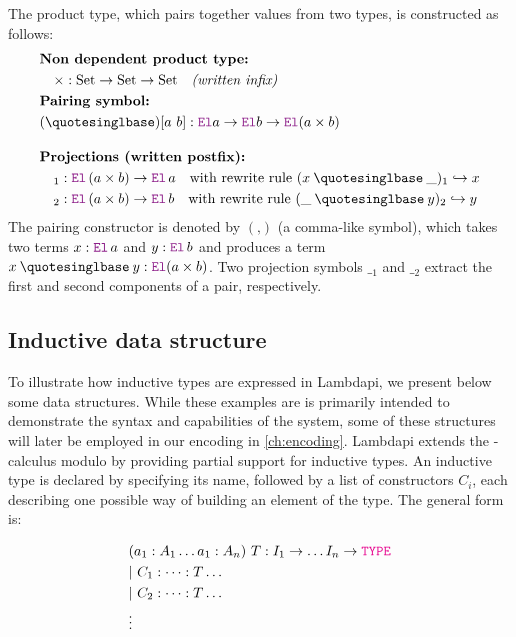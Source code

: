 \begin{example}\label{def-product}
The product type, which pairs together values from two types, is constructed as follows:
\begin{align*}
&\textbf{Non dependent product type:} \\
&\quad \times \index{$\times$} : \text{Set} \to \text{Set} \to \text{Set} \quad \textit{(written infix)} \\
&\textbf{Pairing symbol:} \\
&(\mathbin{‚}) \index{$(\_ \mathbin{,} \_)$} [a~b] : \el a \ra \el b \ra \el (a \times b)\\[1em]
&\textbf{Projections (written postfix):}  \\
&\quad {}_1 \index{${}_1$}: \el\, (a \times b) \ra \el\, a \quad \text{with rewrite rule } (x \mathbin{‚} \_)_1 \re x \\
&\quad {}_2 \index{${}_2$}: \el\, (a \times b) \ra \el\, b \quad \text{with rewrite rule } (\_ \mathbin{‚} y)_2 \re y
\end{align*}
The pairing constructor is denoted by $(‚)$ (a comma-like symbol), which takes two terms $x : \el\,a$ and $y : \el\, b$ and produces a term $x \mathbin{‚} y : \el (a \times b)$.
Two projection symbols ${\_}_1$ and ${\_}_2$ extract the first and second components of a pair, respectively.
\end{example}

\subsection{Inductive data structure}

To illustrate how inductive types are expressed in Lambdapi, we present below some data structures.
While these examples are is primarily intended to demonstrate the syntax and capabilities of the system, some of these structures will later be employed in our encoding in \cref{ch:encoding}.
Lambdapi extends the \lpm-calculus modulo by providing partial support for inductive types.
An inductive type is declared by specifying its name, followed by a list of constructors $C_i$, each describing one possible way of building an element of the type.
The general form is:

\begin{align*}
&(a_1 : A_1 \dots a_1 : A_n)~T : I_1 \ra \dots I_n \ra \type\\
&|~C_1 : \dots : T \dots\\
&|~C_2 : \dots : T \dots\\
&\vdots
\end{align*}

